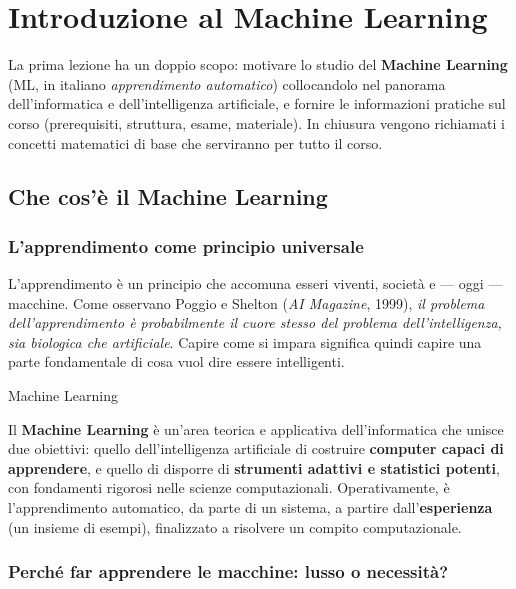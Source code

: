 \chapter{Introduzione al Machine Learning}\label{ch-01}

La prima lezione ha un doppio scopo: motivare lo studio del
\textbf{Machine Learning} (ML, in italiano \emph{apprendimento
automatico}) collocandolo nel panorama dell'informatica e
dell'intelligenza artificiale, e fornire le informazioni pratiche sul
corso (prerequisiti, struttura, esame, materiale). In chiusura vengono
richiamati i concetti matematici di base che serviranno per tutto il
corso.

\section{Che cos'è il Machine
Learning}\label{che-cosuxe8-il-machine-learning}

\subsection{L'apprendimento come principio
universale}\label{lapprendimento-come-principio-universale}

L'apprendimento è un principio che accomuna esseri viventi, società e
--- oggi --- macchine. Come osservano Poggio e Shelton (\emph{AI
Magazine}, 1999), \emph{il problema dell'apprendimento è probabilmente
il cuore stesso del problema dell'intelligenza, sia biologica che
artificiale}. Capire come si impara significa quindi capire una parte
fondamentale di cosa vuol dire essere intelligenti.

\begin{boxdefinition}{Machine Learning}

Il \textbf{Machine Learning} è un'area teorica e applicativa
dell'informatica che unisce due obiettivi: quello dell'intelligenza
artificiale di costruire \textbf{computer capaci di apprendere}, e
quello di disporre di \textbf{strumenti adattivi e statistici potenti},
con fondamenti rigorosi nelle scienze computazionali. Operativamente, è
l'apprendimento automatico, da parte di un sistema, a partire
dall'\textbf{esperienza} (un insieme di esempi), finalizzato a risolvere
un compito computazionale.

\end{boxdefinition}

\subsection{Perché far apprendere le macchine: lusso o
necessità?}\label{perchuxe9-far-apprendere-le-macchine-lusso-o-necessituxe0}

